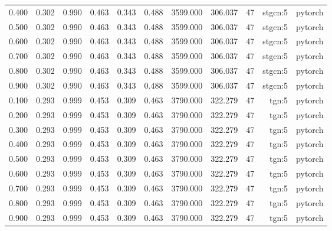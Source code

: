 \begin{tabular}{lrrrrrrrrrr}
0.400 & 0.302 & 0.990 & 0.463 & 0.343 & 0.488 & 3599.000 & 306.037 & 47 & stgcn:5 & pytorch \\
0.500 & 0.302 & 0.990 & 0.463 & 0.343 & 0.488 & 3599.000 & 306.037 & 47 & stgcn:5 & pytorch \\
0.600 & 0.302 & 0.990 & 0.463 & 0.343 & 0.488 & 3599.000 & 306.037 & 47 & stgcn:5 & pytorch \\
0.700 & 0.302 & 0.990 & 0.463 & 0.343 & 0.488 & 3599.000 & 306.037 & 47 & stgcn:5 & pytorch \\
0.800 & 0.302 & 0.990 & 0.463 & 0.343 & 0.488 & 3599.000 & 306.037 & 47 & stgcn:5 & pytorch \\
0.900 & 0.302 & 0.990 & 0.463 & 0.343 & 0.488 & 3599.000 & 306.037 & 47 & stgcn:5 & pytorch \\
0.100 & 0.293 & 0.999 & 0.453 & 0.309 & 0.463 & 3790.000 & 322.279 & 47 & tgn:5 & pytorch \\
0.200 & 0.293 & 0.999 & 0.453 & 0.309 & 0.463 & 3790.000 & 322.279 & 47 & tgn:5 & pytorch \\
0.300 & 0.293 & 0.999 & 0.453 & 0.309 & 0.463 & 3790.000 & 322.279 & 47 & tgn:5 & pytorch \\
0.400 & 0.293 & 0.999 & 0.453 & 0.309 & 0.463 & 3790.000 & 322.279 & 47 & tgn:5 & pytorch \\
0.500 & 0.293 & 0.999 & 0.453 & 0.309 & 0.463 & 3790.000 & 322.279 & 47 & tgn:5 & pytorch \\
0.600 & 0.293 & 0.999 & 0.453 & 0.309 & 0.463 & 3790.000 & 322.279 & 47 & tgn:5 & pytorch \\
0.700 & 0.293 & 0.999 & 0.453 & 0.309 & 0.463 & 3790.000 & 322.279 & 47 & tgn:5 & pytorch \\
0.800 & 0.293 & 0.999 & 0.453 & 0.309 & 0.463 & 3790.000 & 322.279 & 47 & tgn:5 & pytorch \\
0.900 & 0.293 & 0.999 & 0.453 & 0.309 & 0.463 & 3790.000 & 322.279 & 47 & tgn:5 & pytorch \\
\bottomrule
\end{tabular}